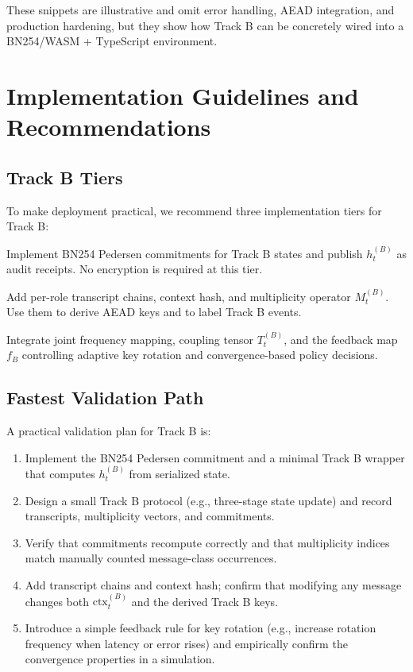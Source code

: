 \documentclass[11pt]{article}
\begin{document}
These snippets are illustrative and omit error handling, AEAD integration, and production hardening, but they show how Track B can be concretely wired into a BN254/WASM + TypeScript environment.

\section{Implementation Guidelines and Recommendations}

\subsection{Track B Tiers}

To make deployment practical, we recommend three implementation tiers for Track B:

\begin{description}[leftmargin=1.5em]
  \item[Tier 1: Commitment and receipts.] Implement BN254 Pedersen commitments for Track B states and publish \(h_t^{(B)}\) as audit receipts. No encryption is required at this tier.
  \item[Tier 2: Transcript and multiplicity binding.] Add per-role transcript chains, context hash, and multiplicity operator \(M_t^{(B)}\). Use them to derive AEAD keys and to label Track B events.
  \item[Tier 3: Full QSBS and feedback dynamics.] Integrate joint frequency mapping, coupling tensor \(T_t^{(B)}\), and the feedback map \(f_B\) controlling adaptive key rotation and convergence-based policy decisions.
\end{description}

\subsection{Fastest Validation Path}

A practical validation plan for Track B is:
\begin{enumerate}[leftmargin=1.5em]
  \item Implement the BN254 Pedersen commitment and a minimal Track B wrapper that computes \(h_t^{(B)}\) from serialized state.
  \item Design a small Track B protocol (e.g., three-stage state update) and record transcripts, multiplicity vectors, and commitments.
  \item Verify that commitments recompute correctly and that multiplicity indices match manually counted message-class occurrences.
  \item Add transcript chains and context hash; confirm that modifying any message changes both \(\mathrm{ctx}_t^{(B)}\) and the derived Track B keys.
  \item Introduce a simple feedback rule for key rotation (e.g., increase rotation frequency when latency or error rises) and empirically confirm the convergence properties in a simulation.
\end{enumerate}
\end{document}
